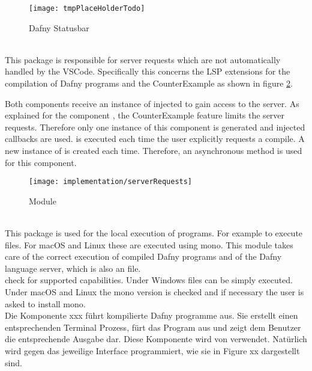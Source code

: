\begin{figure}[H]
    \centering
    \texttt{[image: tmpPlaceHolderTodo]}
    \caption{Dafny Statusbar}
    \label{fig:statusbar}
\end{figure}

\textbf{}\\
This package is responsible for server requests which are not automatically handled by the VSCode.
Specifically this concerns the LSP extensions for the compilation of Dafny programs and the CounterExample
as shown in figure \ref{fig:serverRequests}.

Both components receive an instance of  injected to gain access to the server.
As explained for the component ,
the CounterExample feature limits the server requests.
Therefore only one instance of this component is generated and injected callbacks are used.
 is executed each time the user explicitly requests a compile.
A new instance of  is created each time.
Therefore, an asynchronous method is used for this component.

\begin{figure}[H]
    \centering
    \texttt{[image: implementation/serverRequests]}
    \caption{Module }
    \label{fig:serverRequests}
\end{figure}

\textbf{}\\
This package is used for the local execution of programs.
For example to execute  files.
For macOS and Linux these are executed using mono.
This module takes care of the correct execution of compiled Dafny programs
and of the Dafny language server, which is also an  file.\\

 check for supported capabilities.
Under Windows  files can be simply executed.
Under macOS and Linux the mono version is checked and if necessary the user is asked to install mono. \\


Die Komponente xxx führt kompilierte Dafny programme aus. Sie erstellt einen entsprechenden Terminal Prozess,
fürt das Program aus und zeigt dem Benutzer die entsprechende Ausgabe dar. Diese Komponente wird von
 verwendet. Natürlich wird gegen das jeweilige Interface programmiert, wie sie in Figure xx dargestellt sind.

